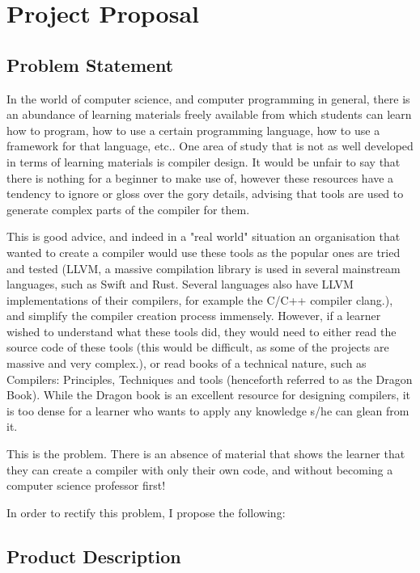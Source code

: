 \documentclass[a4paper,12pt]{article}
\author{Lem}
\date{\today}
\title{}
\begin{document}
\section{Project Proposal}
\label{sec:org3265418}
\subsection{Problem Statement}
\label{sec:org15e804a}

In the world of computer science, and computer programming in general, there is an abundance of learning materials freely available from which students can learn how to program, how to use a certain programming language, how to use a framework for that language, etc.. One area of study that is not as well developed in terms of learning materials is compiler design. It would be unfair to say that there is nothing for a beginner to make use of, however these resources have a tendency to ignore or gloss over the gory details, advising that tools are used to generate complex parts of the compiler for them. 

This is good advice, and indeed in a "real world" situation an organisation that wanted to create a compiler would use these tools as the popular ones are tried and tested (LLVM, a massive compilation library is used in several mainstream languages, such as Swift and Rust. Several languages also have LLVM implementations of their compilers, for example the C/C++ compiler clang.), and simplify the compiler creation process immensely. However, if a learner wished to understand what these tools did, they would need to either read the source code of these tools (this would be difficult, as some of the projects are massive and very complex.), or read books of a technical nature, such as Compilers: Principles, Techniques and tools (henceforth referred to as the Dragon Book). While the Dragon book is an excellent resource for designing compilers, it is too dense for a learner who wants to apply any knowledge s/he can glean from it. 

This is the problem. There is an absence of material that shows the learner that they can create a compiler with only their own code, and without becoming a computer science professor first!

In order to rectify this problem, I propose the following: 

\subsection{Product Description}
\label{sec:orgf3c892a}
\end{document}
